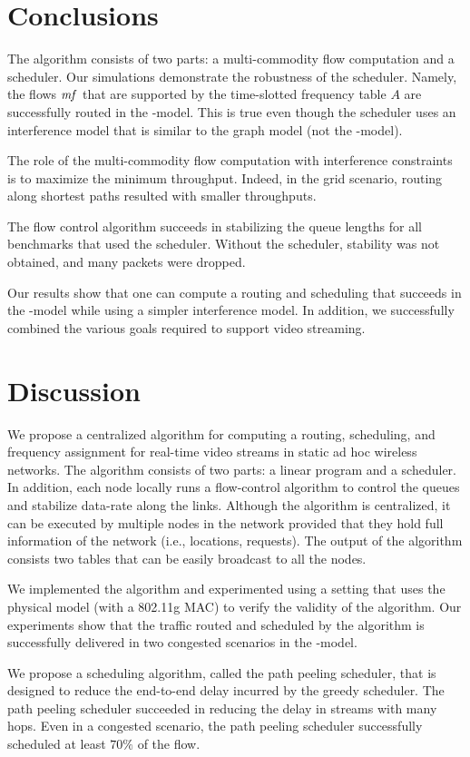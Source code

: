 \documentclass[12pt]{article}
\newenvironment{proof sketch}[1]{\noindent {\emph{Proof sketch of #1:}}}{\hfill \qed}
\newcommand{\SINR}{\text{\sc{sinr}}}
\newcommand{\mf}{\text{\emph{mf}}}
\begin{document}
\section{Conclusions}
The algorithm consists of two parts: a multi-commodity flow
computation and a scheduler.  Our simulations demonstrate the
robustness of the scheduler.  Namely, the flows $\mf$ that are
supported by the time-slotted frequency table $A$ are successfully
routed in the \SINR-model. This is true even though the scheduler uses
an interference model that is similar to the graph model (not the \SINR-model).

The role of the multi-commodity flow computation with interference
constraints is to maximize the minimum throughput. Indeed, in the grid scenario, routing
along shortest paths resulted with smaller throughputs.

The flow control algorithm succeeds in stabilizing the queue lengths
for all benchmarks that used the scheduler. Without the scheduler,
stability was not obtained, and many packets were dropped.

Our results show that one can compute a routing and scheduling that
succeeds in the \SINR-model while using a simpler interference model.
In addition, we successfully combined the various goals required to
support video streaming.

\section{Discussion}
We propose a centralized algorithm for computing a routing,
scheduling, and frequency assignment for real-time video streams in
static ad hoc wireless networks.  The algorithm consists of two parts:
a linear program and a scheduler.  In addition, each node locally runs
a flow-control algorithm to control the queues and stabilize data-rate
along the links.  Although the algorithm is centralized, it can be
executed by multiple nodes in the network provided that they hold full
information of the network (i.e., locations, requests).  The output of
the algorithm consists two tables that can be easily broadcast to all the
nodes.

We implemented the algorithm and experimented using a setting that
uses the physical model (with a 802.11g MAC) to verify the validity of the algorithm.  Our
experiments show that the traffic routed and scheduled by the
algorithm is successfully delivered in two congested scenarios in the
\SINR-model.

We propose a scheduling algorithm, called the path peeling scheduler,
that is designed to reduce the end-to-end delay incurred by the greedy
scheduler. The path peeling scheduler succeeded in reducing the delay
in streams with many hops. Even in a congested scenario, the path
peeling scheduler successfully scheduled at least $70\%$ of the flow.
\end{document}
